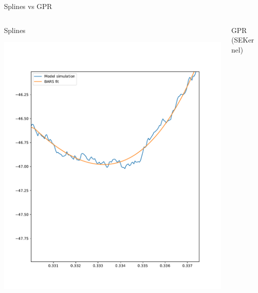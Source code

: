 \documentclass[presentation]{beamer}
\begin{document}
\begin{frame}[plain,label={sec:org4172f2d}]{Splines vs GPR}
\begin{columns}
\begin{column}{0.5\columnwidth}
\begin{center}
Splines
\end{center}

\begin{center}
\includegraphics[width=1.1\textwidth]{./BARS2.pdf}
\end{center}    
\end{column}


\begin{column}{0.5\columnwidth}
\begin{center}
GPR (SEKernel)
\end{center}


\end{column}
\end{columns}
\end{frame}
\end{document}
